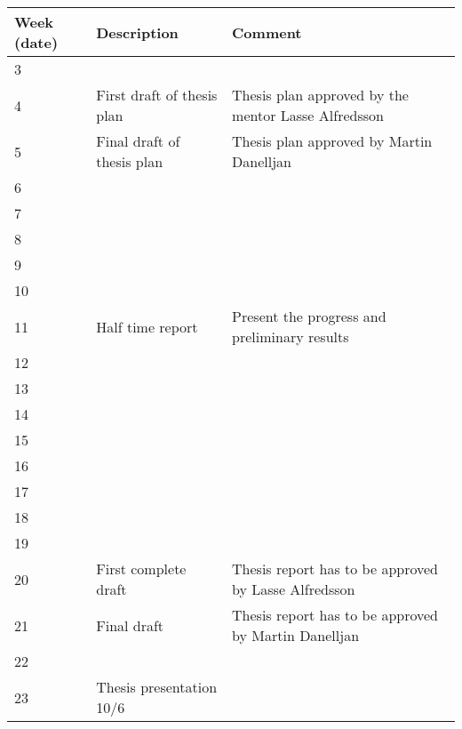 

\begin{tabular}{|l|l|l|}
	\hline
	Week (date) & Description                & Comment                                              \\ \hline
	3           &                            &  \\ \hline
	4           & First draft of thesis plan & Thesis plan approved by the mentor Lasse Alfredsson  \\ \hline
	5           & Final draft of thesis plan & Thesis plan approved by Martin Danelljan             \\ \hline
	6           &                            &  \\ \hline
	7           &                            &  \\ \hline
	8           &                            &  \\ \hline
	9           &                            &  \\ \hline
	10          &                            &  \\ \hline
	11          & Half time report           & Present the progress and preliminary results         \\ \hline
	12          &                            &  \\ \hline
	13          &                            &  \\ \hline
	14          &                            &  \\ \hline
	15          &                            &  \\ \hline
	16          &                            &  \\ \hline
	17          &                            &  \\ \hline
	18          &                            &  \\ \hline
	19          &                            &  \\ \hline
	20          & First complete draft       & Thesis report has to be approved by Lasse Alfredsson \\ \hline
	21          & Final draft                & Thesis report has to be approved by Martin Danelljan \\ \hline
	22          &                            &  \\ \hline
	23          & Thesis presentation 10/6   &  \\ \hline
\end{tabular}